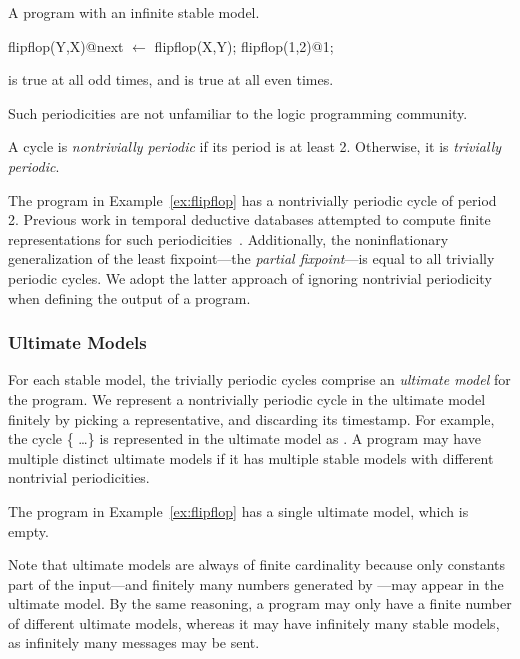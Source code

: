 \begin{example}
\label{ex:flipflop}
A \lang program with an infinite stable model.

\begin{Dedalus}
flipflop(Y,X)@next \(\leftarrow\) flipflop(X,Y);
flipflop(1,2)@1;
\end{Dedalus}

 is true at all odd times, and  is true at all even times.
\end{example}

Such periodicities are not unfamiliar to the logic programming community.  

\begin{definition}
A cycle is {\em nontrivially periodic} if its period is at least 2.  Otherwise, it is {\em trivially periodic}.
\end{definition}

The program in Example~\ref{ex:flipflop} has a nontrivially periodic cycle of period 2.  Previous work in temporal deductive databases attempted to compute finite representations for such periodicities~\cite{tdd-infinite}.  Additionally, the noninflationary generalization of the least fixpoint---the {\em partial fixpoint}---is equal to all trivially periodic cycles.  We adopt the latter approach of ignoring nontrivial periodicity when defining the output of a \lang program.

\subsubsection{Ultimate Models}

\begin{definition}
For each stable model, the trivially periodic cycles comprise an {\em ultimate model} for the program.  We represent a nontrivially periodic cycle in the ultimate model finitely by picking a representative, and discarding its timestamp.  For example, the cycle \{ \ldots\} is represented in the ultimate model as .  A program may have multiple distinct ultimate models if it has multiple stable models with different nontrivial periodicities.
\end{definition}

The program in Example~\ref{ex:flipflop} has a single ultimate model, which is empty.

Note that ultimate models are always of finite cardinality because only constants part of the input---and finitely many numbers generated by ---may appear in the ultimate model.  By the same reasoning, a \lang program may only have a finite number of different ultimate models, whereas it may have infinitely many stable models, as infinitely many messages may be sent.
%

